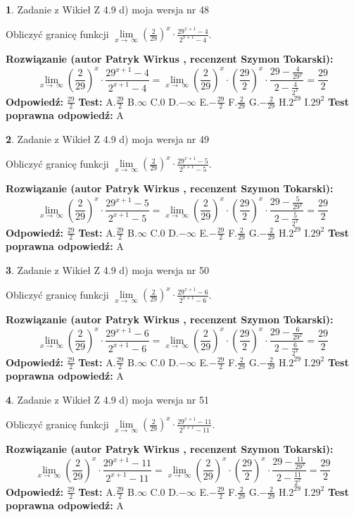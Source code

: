 \documentclass[12pt, a4paper]{article}
\theoremstyle{definition} %
\newtheorem{zad}{}
\newcommand{\zadStart}[1]{\begin{zad}#1\newline}
\newcommand{\zadStop}{\end{zad}}
\newcommand{\rozwStart}[2]{\noindent \textbf{Rozwiązanie (autor #1 , recenzent #2): }\newline}
\newcommand{\rozwStop}{\newline}
\newcommand{\odpStart}{\noindent \textbf{Odpowiedź:}\newline}
\newcommand{\odpStop}{\newline}
\newcommand{\testStart}{\noindent \textbf{Test:}\newline}
\newcommand{\testStop}{\newline}
\newcommand{\kluczStart}{\noindent \textbf{Test poprawna odpowiedź:}\newline}
\newcommand{\kluczStop}{\newline}
\begin{document}
\zadStart{Zadanie z Wikieł Z 4.9 d) moja wersja nr 48}


Obliczyć granicę funkcji  $\lim\limits_{x\to\ \infty}(\frac{2}{29})^{x}\cdot\frac{29^{x+1}-4}{2^{x+1}-4}$.
\zadStop
\rozwStart{Patryk Wirkus}{Szymon Tokarski}
$$\lim\limits_{x\to\ \infty}(\frac{2}{29})^{x}\cdot\frac{29^{x+1}-4}{2^{x+1}-4}=\lim\limits_{x\to\ \infty}(\frac{2}{29})^{x}\cdot(\frac{29}{2})^{x} \cdot \frac{29-\frac{4}{29^{x}}}{2-\frac{4}{2^{x}}} = \frac{29}{2}$$
\rozwStop
\odpStart
$\frac{29}{2}$
\odpStop
\testStart
A.$\frac{29}{2}$ B.$\infty$ C.$0$ D.$-\infty$ E.$-\frac{29}{2}$
F.$\frac{2}{29}$ G.$-\frac{2}{29}$
H.$2^{29}$
I.$29^{2}$
\testStop
\kluczStart
A
\kluczStop



\zadStart{Zadanie z Wikieł Z 4.9 d) moja wersja nr 49}


Obliczyć granicę funkcji  $\lim\limits_{x\to\ \infty}(\frac{2}{29})^{x}\cdot\frac{29^{x+1}-5}{2^{x+1}-5}$.
\zadStop
\rozwStart{Patryk Wirkus}{Szymon Tokarski}
$$\lim\limits_{x\to\ \infty}(\frac{2}{29})^{x}\cdot\frac{29^{x+1}-5}{2^{x+1}-5}=\lim\limits_{x\to\ \infty}(\frac{2}{29})^{x}\cdot(\frac{29}{2})^{x} \cdot \frac{29-\frac{5}{29^{x}}}{2-\frac{5}{2^{x}}} = \frac{29}{2}$$
\rozwStop
\odpStart
$\frac{29}{2}$
\odpStop
\testStart
A.$\frac{29}{2}$ B.$\infty$ C.$0$ D.$-\infty$ E.$-\frac{29}{2}$
F.$\frac{2}{29}$ G.$-\frac{2}{29}$
H.$2^{29}$
I.$29^{2}$
\testStop
\kluczStart
A
\kluczStop



\zadStart{Zadanie z Wikieł Z 4.9 d) moja wersja nr 50}


Obliczyć granicę funkcji  $\lim\limits_{x\to\ \infty}(\frac{2}{29})^{x}\cdot\frac{29^{x+1}-6}{2^{x+1}-6}$.
\zadStop
\rozwStart{Patryk Wirkus}{Szymon Tokarski}
$$\lim\limits_{x\to\ \infty}(\frac{2}{29})^{x}\cdot\frac{29^{x+1}-6}{2^{x+1}-6}=\lim\limits_{x\to\ \infty}(\frac{2}{29})^{x}\cdot(\frac{29}{2})^{x} \cdot \frac{29-\frac{6}{29^{x}}}{2-\frac{6}{2^{x}}} = \frac{29}{2}$$
\rozwStop
\odpStart
$\frac{29}{2}$
\odpStop
\testStart
A.$\frac{29}{2}$ B.$\infty$ C.$0$ D.$-\infty$ E.$-\frac{29}{2}$
F.$\frac{2}{29}$ G.$-\frac{2}{29}$
H.$2^{29}$
I.$29^{2}$
\testStop
\kluczStart
A
\kluczStop



\zadStart{Zadanie z Wikieł Z 4.9 d) moja wersja nr 51}


Obliczyć granicę funkcji  $\lim\limits_{x\to\ \infty}(\frac{2}{29})^{x}\cdot\frac{29^{x+1}-11}{2^{x+1}-11}$.
\zadStop
\rozwStart{Patryk Wirkus}{Szymon Tokarski}
$$\lim\limits_{x\to\ \infty}(\frac{2}{29})^{x}\cdot\frac{29^{x+1}-11}{2^{x+1}-11}=\lim\limits_{x\to\ \infty}(\frac{2}{29})^{x}\cdot(\frac{29}{2})^{x} \cdot \frac{29-\frac{11}{29^{x}}}{2-\frac{11}{2^{x}}} = \frac{29}{2}$$
\rozwStop
\odpStart
$\frac{29}{2}$
\odpStop
\testStart
A.$\frac{29}{2}$ B.$\infty$ C.$0$ D.$-\infty$ E.$-\frac{29}{2}$
F.$\frac{2}{29}$ G.$-\frac{2}{29}$
H.$2^{29}$
I.$29^{2}$
\testStop
\kluczStart
A
\kluczStop
\end{document}
